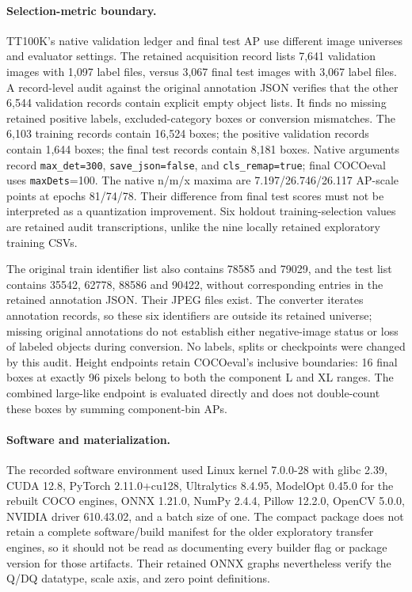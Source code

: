 \documentclass[10pt]{article}
\begin{document}
\paragraph{Selection-metric boundary.}
TT100K's native validation ledger and final test AP use different image universes and evaluator settings. The retained acquisition record lists 7,641 validation images with 1,097 label files, versus 3,067 final test images with 3,067 label files. A record-level audit against the original annotation JSON verifies that the other 6,544 validation records contain explicit empty object lists. It finds no missing retained positive labels, excluded-category boxes or conversion mismatches. The 6,103 training records contain 16,524 boxes; the positive validation records contain 1,644 boxes; the final test records contain 8,181 boxes. Native arguments record \texttt{max\_det=300}, \texttt{save\_json=false}, and \texttt{cls\_remap=true}; final COCOeval uses \texttt{maxDets}=100. The native n/m/x maxima are 7.197/26.746/26.117 AP-scale points at epochs 81/74/78. Their difference from final test scores must not be interpreted as a quantization improvement. Six holdout training-selection values are retained audit transcriptions, unlike the nine locally retained exploratory training CSVs.

The original train identifier list also contains 78585 and 79029, and the test list contains 35542, 62778, 88586 and 90422, without corresponding entries in the retained annotation JSON. Their JPEG files exist. The converter iterates annotation records, so these six identifiers are outside its retained universe; missing original annotations do not establish either negative-image status or loss of labeled objects during conversion. No labels, splits or checkpoints were changed by this audit. Height endpoints retain COCOeval's inclusive boundaries: 16 final boxes at exactly 96 pixels belong to both the component L and XL ranges. The combined large-like endpoint is evaluated directly and does not double-count these boxes by summing component-bin APs.

\paragraph{Software and materialization.}
The recorded software environment used Linux kernel 7.0.0-28 with glibc 2.39, CUDA 12.8, PyTorch 2.11.0+cu128, Ultralytics 8.4.95, ModelOpt 0.45.0 for the rebuilt COCO engines, ONNX 1.21.0, NumPy 2.4.4, Pillow 12.2.0, OpenCV 5.0.0, NVIDIA driver 610.43.02, and a batch size of one. The compact package does not retain a complete software/build manifest for the older exploratory transfer engines, so it should not be read as documenting every builder flag or package version for those artifacts. Their retained ONNX graphs nevertheless verify the Q/DQ datatype, scale axis, and zero point definitions.
\end{document}
